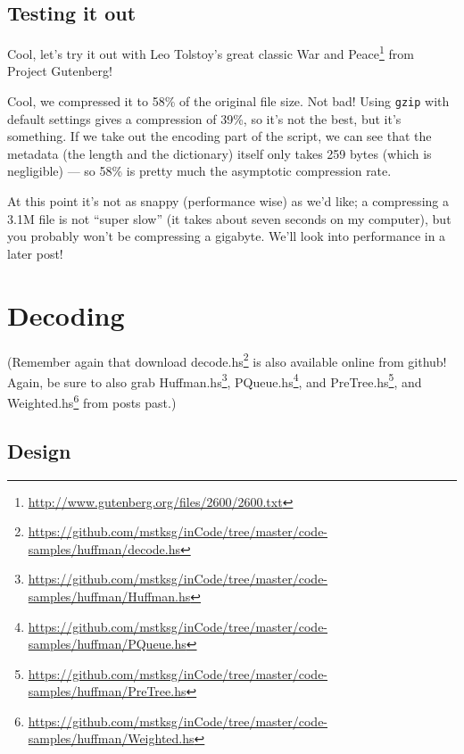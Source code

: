 \documentclass[]{article}
\newenvironment{Shaded}{}{}
\newcommand{\KeywordTok}[1]{\textcolor[rgb]{0.00,0.44,0.13}{\textbf{{#1}}}}
\newcommand{\CommentTok}[1]{\textcolor[rgb]{0.38,0.63,0.69}{\textit{{#1}}}}
\newcommand{\NormalTok}[1]{{#1}}
\renewcommand{\href}[2]{#2\footnote{\url{#1}}}
\begin{document}
\subsection{Testing it out}\label{testing-it-out}

Cool, let's try it out with Leo Tolstoy's great classic
\href{http://www.gutenberg.org/files/2600/2600.txt}{War and Peace} from Project
Gutenberg!

\begin{Shaded}
\end{Shaded}

Cool, we compressed it to 58\% of the original file size. Not bad! Using
\texttt{gzip} with default settings gives a compression of 39\%, so it's not the
best, but it's something. If we take out the encoding part of the script, we can
see that the metadata (the length and the dictionary) itself only takes 259
bytes (which is negligible) --- so 58\% is pretty much the asymptotic
compression rate.

At this point it's not as snappy (performance wise) as we'd like; a compressing
a 3.1M file is not ``super slow'' (it takes about seven seconds on my computer),
but you probably won't be compressing a gigabyte. We'll look into performance in
a later post!

\section{Decoding}\label{decoding}

(Remember again that download
\href{https://github.com/mstksg/inCode/tree/master/code-samples/huffman/decode.hs}{decode.hs}
is also available online from github! Again, be sure to also grab
\href{https://github.com/mstksg/inCode/tree/master/code-samples/huffman/Huffman.hs}{Huffman.hs},
\href{https://github.com/mstksg/inCode/tree/master/code-samples/huffman/PQueue.hs}{PQueue.hs},
and
\href{https://github.com/mstksg/inCode/tree/master/code-samples/huffman/PreTree.hs}{PreTree.hs},
and
\href{https://github.com/mstksg/inCode/tree/master/code-samples/huffman/Weighted.hs}{Weighted.hs}
from posts past.)

\subsection{Design}\label{design-1}
\end{document}
